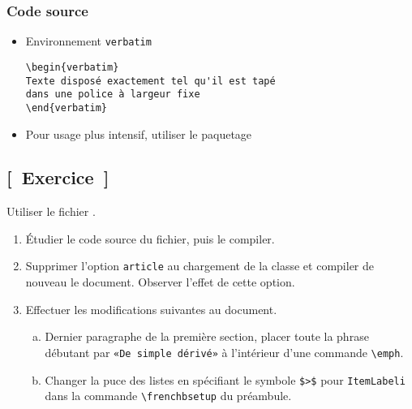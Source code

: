 \begin{frame}[fragile=singleslide]
  \frametitle{Code source}
  \begin{itemize}
  \item Environnement \texttt{verbatim}
\begin{lstlisting}
\begin{verbatim}
Texte disposé exactement tel qu'il est tapé
dans une police à largeur fixe
\end{verbatim}
\end{lstlisting}
  \item Pour usage plus intensif, utiliser le paquetage 
  \end{itemize}
\end{frame}

\subsection{[~Exercice~]}

\begin{exercice}
  Utiliser le fichier .

  \begin{enumerate}
  \item Étudier le code source du fichier, puis le compiler.
  \item Supprimer l'option \texttt{article} au chargement de la classe
    et compiler de nouveau le document. Observer l'effet de cette
    option.
  \item Effectuer les modifications suivantes au document.
    \begin{enumerate}[a)]
    \item Dernier paragraphe de la première section, placer toute la
      phrase débutant par \texttt{«De simple dérivé»} à l'intérieur
      d'une commande \texttt{{\textbackslash}emph}.
    \item Changer la puce des listes en spécifiant le symbole
      \texttt{\$>\$} pour \verb=ItemLabeli= dans la commande
      \verb=\frenchbsetup= du préambule.
    \end{enumerate}
  \end{enumerate}
\end{exercice}

